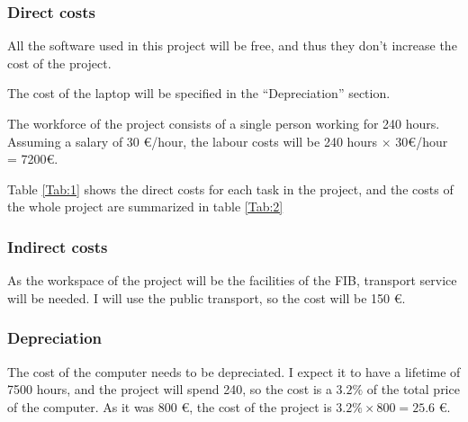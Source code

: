 \documentclass[a4paper]{article}
\begin{document}
            \subsubsection*{Direct costs}

            All the software used in this project will be free, and thus they don't increase the cost of the project.

            The cost of the laptop will be specified in the ``Depreciation'' section.

            The workforce of the project consists of a single person working for 240 hours. Assuming a salary of 30 €/hour, the labour costs will be 240 hours \(\times\) 30€/hour = 7200€.

            Table \ref{Tab:1} shows the direct costs for each task in the project, and the costs of the whole project are summarized in table \ref{Tab:2}

            \subsubsection*{Indirect costs}

            As the workspace of the project will be the facilities of the FIB, transport service will be needed. I will use the public transport, so the cost will be 150 €.

            \subsubsection*{Depreciation}

            The cost of the computer needs to be depreciated. I expect it to have a lifetime of 7500 hours, and the project will spend 240, so the cost is a $3.2 \%$ of the total price of the computer. As it was 800 €, the cost of the project is $3.2 \% \times 800 = 25.6$ €.
\end{document}
